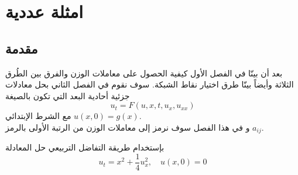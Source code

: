 \chapter{امثلة عددية}

\section[مقدمة]{مقدمة }
بعد أن بينّا في الفصل الأول كيفية الحصول على معاملات الوزن والفرق بين الطُرق الثلاثة وأيضاً بينّا طرق اختيار نقاط الشبكة. سوف نقوم في الفصل الثاني بحل معادلات جزئية أحادية البعد التي تكون بالصيغة 
\begin{equation}\label{eq:one_dim_diff_eq}
	u_t=F(u,x,t,u_x,u_{xx})
\end{equation}
مع الشرط الإبتدائي $u(x,0)=g(x)$.\\
\noindent
و في هذا الفصل سوف نرمز إلى معاملات الوزن من الرتبة الأولى بالرمز $a_{ij}$.

\begin{example}
	بإستخدام طريقة التفاضل التربيعي حل المعادلة 
\begin{equation}
	\label{eq:firstexample}
	u_t = x^2 + \frac{1}{4} u_x^2, \quad u(x, 0) = 0
\end{equation}
\end{example}

